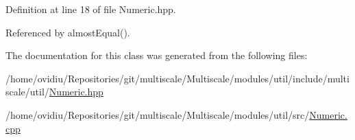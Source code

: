 \-Definition at line 18 of file \-Numeric.\-hpp.



\-Referenced by almost\-Equal().



\-The documentation for this class was generated from the following files\-:\begin{DoxyCompactItemize}
\item 
/home/ovidiu/\-Repositories/git/multiscale/\-Multiscale/modules/util/include/multiscale/util/\hyperlink{Numeric_8hpp}{\-Numeric.\-hpp}\item 
/home/ovidiu/\-Repositories/git/multiscale/\-Multiscale/modules/util/src/\hyperlink{Numeric_8cpp}{\-Numeric.\-cpp}\end{DoxyCompactItemize}
